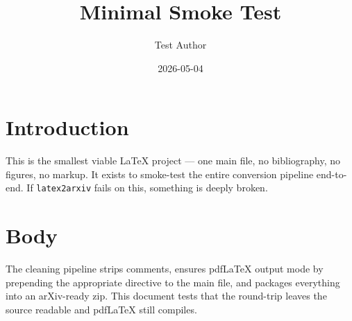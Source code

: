 \documentclass{article}
\title{Minimal Smoke Test}
\author{Test Author}
\date{2026-05-04}
\begin{document}
\maketitle

\section{Introduction}
This is the smallest viable LaTeX project — one main file, no bibliography,
no figures, no markup. It exists to smoke-test the entire conversion
pipeline end-to-end. If \texttt{latex2arxiv} fails on this, something is
deeply broken.

\section{Body}
The cleaning pipeline strips comments, ensures pdfLaTeX output mode by
prepending the appropriate directive to the main file, and packages
everything into an arXiv-ready zip. This document tests that the
round-trip leaves the source readable and pdfLaTeX still compiles.
\end{document}
